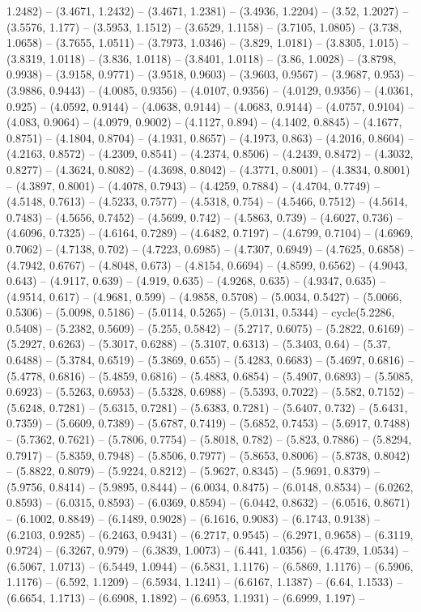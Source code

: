 1.2482) -- (3.4671, 1.2432) -- (3.4671, 1.2381) -- (3.4936, 1.2204) -- (3.52, 1.2027) -- (3.5576, 1.177) -- (3.5953, 1.1512) -- (3.6529, 1.1158) -- (3.7105, 1.0805) -- (3.738, 1.0658) -- (3.7655, 1.0511) -- (3.7973, 1.0346) -- (3.829, 1.0181) -- (3.8305, 1.015) -- (3.8319, 1.0118) -- (3.836, 1.0118) -- (3.8401, 1.0118) -- (3.86, 1.0028) -- (3.8798, 0.9938) -- (3.9158, 0.9771) -- (3.9518, 0.9603) -- (3.9603, 0.9567) -- (3.9687, 0.953) -- (3.9886, 0.9443) -- (4.0085, 0.9356) -- (4.0107, 0.9356) -- (4.0129, 0.9356) -- (4.0361, 0.925) -- (4.0592, 0.9144) -- (4.0638, 0.9144) -- (4.0683, 0.9144) -- (4.0757, 0.9104) -- (4.083, 0.9064) -- (4.0979, 0.9002) -- (4.1127, 0.894) -- (4.1402, 0.8845) -- (4.1677, 0.8751) -- (4.1804, 0.8704) -- (4.1931, 0.8657) -- (4.1973, 0.863) -- (4.2016, 0.8604) -- (4.2163, 0.8572) -- (4.2309, 0.8541) -- (4.2374, 0.8506) -- (4.2439, 0.8472) -- (4.3032, 0.8277) -- (4.3624, 0.8082) -- (4.3698, 0.8042) -- (4.3771, 0.8001) -- (4.3834, 0.8001) -- (4.3897, 0.8001) -- (4.4078, 0.7943) -- (4.4259, 0.7884) -- (4.4704, 0.7749) -- (4.5148, 0.7613) -- (4.5233, 0.7577) -- (4.5318, 0.754) -- (4.5466, 0.7512) -- (4.5614, 0.7483) -- (4.5656, 0.7452) -- (4.5699, 0.742) -- (4.5863, 0.739) -- (4.6027, 0.736) -- (4.6096, 0.7325) -- (4.6164, 0.7289) -- (4.6482, 0.7197) -- (4.6799, 0.7104) -- (4.6969, 0.7062) -- (4.7138, 0.702) -- (4.7223, 0.6985) -- (4.7307, 0.6949) -- (4.7625, 0.6858) -- (4.7942, 0.6767) -- (4.8048, 0.673) -- (4.8154, 0.6694) -- (4.8599, 0.6562) -- (4.9043, 0.643) -- (4.9117, 0.639) -- (4.919, 0.635) -- (4.9268, 0.635) -- (4.9347, 0.635) -- (4.9514, 0.617) -- (4.9681, 0.599) -- (4.9858, 0.5708) -- (5.0034, 0.5427) -- (5.0066, 0.5306) -- (5.0098, 0.5186) -- (5.0114, 0.5265) -- (5.0131, 0.5344) -- cycle(5.2286, 0.5408) -- (5.2382, 0.5609) -- (5.255, 0.5842) -- (5.2717, 0.6075) -- (5.2822, 0.6169) -- (5.2927, 0.6263) -- (5.3017, 0.6288) -- (5.3107, 0.6313) -- (5.3403, 0.64) -- (5.37, 0.6488) -- (5.3784, 0.6519) -- (5.3869, 0.655) -- (5.4283, 0.6683) -- (5.4697, 0.6816) -- (5.4778, 0.6816) -- (5.4859, 0.6816) -- (5.4883, 0.6854) -- (5.4907, 0.6893) -- (5.5085, 0.6923) -- (5.5263, 0.6953) -- (5.5328, 0.6988) -- (5.5393, 0.7022) -- (5.582, 0.7152) -- (5.6248, 0.7281) -- (5.6315, 0.7281) -- (5.6383, 0.7281) -- (5.6407, 0.732) -- (5.6431, 0.7359) -- (5.6609, 0.7389) -- (5.6787, 0.7419) -- (5.6852, 0.7453) -- (5.6917, 0.7488) -- (5.7362, 0.7621) -- (5.7806, 0.7754) -- (5.8018, 0.782) -- (5.823, 0.7886) -- (5.8294, 0.7917) -- (5.8359, 0.7948) -- (5.8506, 0.7977) -- (5.8653, 0.8006) -- (5.8738, 0.8042) -- (5.8822, 0.8079) -- (5.9224, 0.8212) -- (5.9627, 0.8345) -- (5.9691, 0.8379) -- (5.9756, 0.8414) -- (5.9895, 0.8444) -- (6.0034, 0.8475) -- (6.0148, 0.8534) -- (6.0262, 0.8593) -- (6.0315, 0.8593) -- (6.0369, 0.8594) -- (6.0442, 0.8632) -- (6.0516, 0.8671) -- (6.1002, 0.8849) -- (6.1489, 0.9028) -- (6.1616, 0.9083) -- (6.1743, 0.9138) -- (6.2103, 0.9285) -- (6.2463, 0.9431) -- (6.2717, 0.9545) -- (6.2971, 0.9658) -- (6.3119, 0.9724) -- (6.3267, 0.979) -- (6.3839, 1.0073) -- (6.441, 1.0356) -- (6.4739, 1.0534) -- (6.5067, 1.0713) -- (6.5449, 1.0944) -- (6.5831, 1.1176) -- (6.5869, 1.1176) -- (6.5906, 1.1176) -- (6.592, 1.1209) -- (6.5934, 1.1241) -- (6.6167, 1.1387) -- (6.64, 1.1533) -- (6.6654, 1.1713) -- (6.6908, 1.1892) -- (6.6953, 1.1931) -- (6.6999, 1.197) -- 